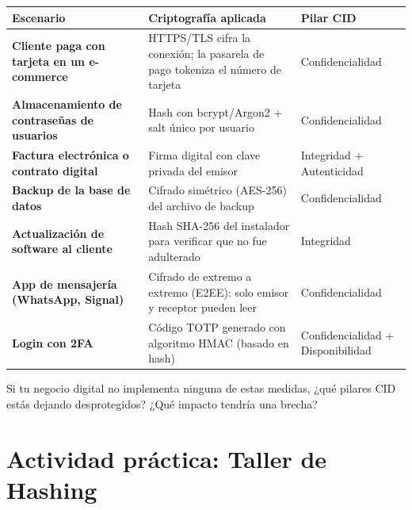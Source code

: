 \documentclass[12pt,a4paper]{article}
\renewcommand{\arraystretch}{1.25}
\begin{document}
\renewcommand{\arraystretch}{1.6}
\begin{tabularx}{\textwidth}{|>{\bfseries}p{3.5cm}|X|>{\centering\arraybackslash}p{2.8cm}|}
\hline
\textbf{Escenario} & \textbf{Criptografía aplicada} & \textbf{Pilar CID} \\
\hline
Cliente paga con tarjeta en un e-commerce & HTTPS/TLS cifra la conexi\'on; la pasarela de pago tokeniza el n\'umero de tarjeta & Confidencialidad \\
\hline
Almacenamiento de contrase\~nas de usuarios & Hash con bcrypt/Argon2 + salt \'unico por usuario & Confidencialidad \\
\hline
Factura electr\'onica o contrato digital & Firma digital con clave privada del emisor & Integridad + Autenticidad \\
\hline
Backup de la base de datos & Cifrado sim\'etrico (AES-256) del archivo de backup & Confidencialidad \\
\hline
Actualizaci\'on de software al cliente & Hash SHA-256 del instalador para verificar que no fue adulterado & Integridad \\
\hline
App de mensajer\'ia (WhatsApp, Signal) & Cifrado de extremo a extremo (E2EE): solo emisor y receptor pueden leer & Confidencialidad \\
\hline
Login con 2FA & C\'odigo TOTP generado con algoritmo HMAC (basado en hash) & Confidencialidad + Disponibilidad \\
\hline
\end{tabularx}

\begin{cajaConcepto}[title={Pregunta para reflexionar}]
Si tu negocio digital no implementa ninguna de estas medidas, ¿qu\'e pilares CID est\'as dejando desprotegidos? ¿Qu\'e impacto tendr\'ia una brecha?
\end{cajaConcepto}

\newpage
\section{Actividad pr\'actica: Taller de Hashing}
\end{document}
